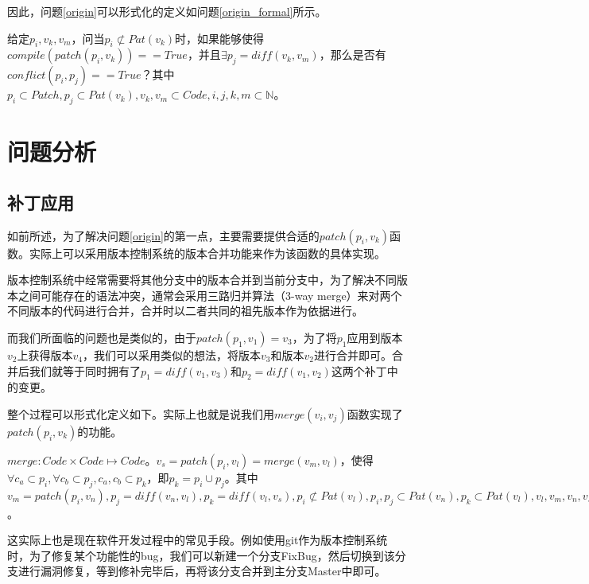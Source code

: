 因此，问题\ref {origin}可以形式化的定义如问题\ref {origin_formal}所示。
\begin{problem}
	\label {origin_formal}
	给定$p_i,v_k,v_m$，问当$p_i \not \subset Pat(v_k)$时，如果能够使得$compile(patch(p_i,v_k)) == True$，并且$\exists p_j = diff(v_k,v_m)$，那么是否有$conflict(p_i,p_j) == True$？其中$p_i \subset Patch,p_j \subset Pat(v_k),v_k,v_m \subset Code,i,j,k,m \subset \mathbb{N}$。
\end{problem}

\section{问题分析}
\label {problem_analysis}

\subsection{补丁应用}
\label {patch_app}

如前所述，为了解决问题\ref {origin}的第一点，主要需要提供合适的$patch(p_i,v_k)$函数。实际上可以采用版本控制系统的版本合并功能来作为该函数的具体实现。

版本控制系统中经常需要将其他分支中的版本合并到当前分支中，为了解决不同版本之间可能存在的语法冲突，通常会采用三路归并算法（3-way merge）来对两个不同版本的代码进行合并，合并时以二者共同的祖先版本作为依据进行。

而我们所面临的问题也是类似的，由于$patch(p_1,v_1) = v_3$，为了将$p_1$应用到版本$v_2$上获得版本$v_4$，我们可以采用类似的想法，将版本$v_3$和版本$v_2$进行合并即可。合并后我们就等于同时拥有了$p_1 = diff(v_1,v_3)$和$p_2 = diff(v_1,v_2)$这两个补丁中的变更。

整个过程可以形式化定义如下。实际上也就是说我们用$merge(v_i,v_j)$函数实现了$patch(p_i,v_k)$的功能。

\begin{definition}
	$merge: Code \times Code \mapsto Code$。$v_s = patch(p_i,v_l) = merge(v_m,v_l)$，使得$\forall c_a \subset p_i,\forall c_b \subset p_j,c_a,c_b \subset p_k$，即$p_k = p_i \cup p_j$。其中$v_m = patch(p_i,v_n),p_j = diff(v_n,v_l),p_k = diff(v_l,v_s),p_i \not \subset Pat(v_l),p_i,p_j \subset Pat(v_n),p_k \subset Pat(v_l),v_l,v_m,v_n,v_s \subset Code,a,b,i,j,k,l,m,n,s \subset \mathbb{N}$。
\end{definition}

这实际上也是现在软件开发过程中的常见手段。例如使用git作为版本控制系统时，为了修复某个功能性的bug，我们可以新建一个分支FixBug，然后切换到该分支进行漏洞修复，等到修补完毕后，再将该分支合并到主分支Master中即可。

